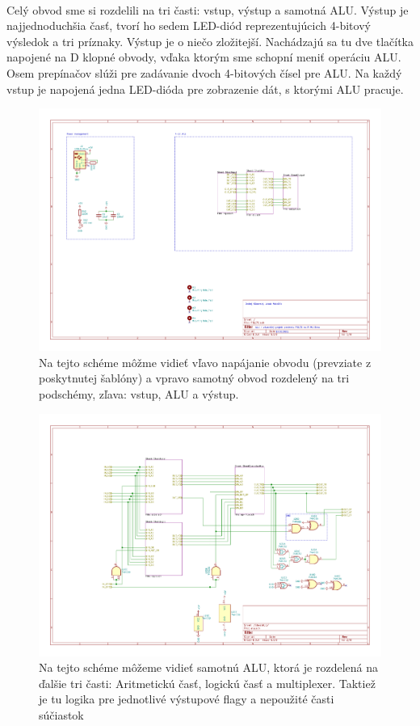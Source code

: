 \documentclass{article}
\begin{document}
    \paragraph{}
    Celý obvod sme si rozdelili na tri časti: vstup, výstup a samotná ALU. Výstup je najjednoduchšia časť, tvorí ho sedem LED-diód reprezentujúcich 4-bitový výsledok a tri príznaky. Výstup je o niečo zložitejší. Nachádzajú sa tu dve tlačítka napojené na D klopné obvody, vďaka ktorým sme schopní meniť operáciu ALU. Osem prepínačov slúži pre zadávanie dvoch 4-bitových čísel pre ALU. Na každý vstup je napojená jedna LED-dióda pre zobrazenie dát, s ktorými ALU pracuje.

    \begin{figure}[h!]
        \centering
        \includegraphics[width=.8\linewidth]{top_sheet.pdf}
        \caption{Na tejto schéme môžme vidieť vľavo napájanie obvodu (prevziate z poskytnutej šablóny) a vpravo samotný obvod rozdelený na tri podschémy, zľava: vstup, ALU a výstup.}
    \end{figure}

    \begin{figure}[h!]
        \centering
        \includegraphics[width=.8\linewidth]{alu_sheet.pdf}
        \caption{Na tejto schéme môžeme vidieť samotnú ALU, ktorá je rozdelená na ďalšie tri časti: Aritmetickú časť, logickú časť a multiplexer. Taktiež je tu logika pre jednotlivé výstupové flagy a nepoužité časti súčiastok}
    \end{figure}
\end{document}
